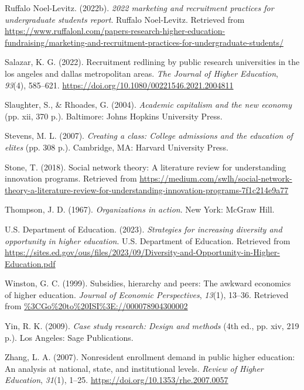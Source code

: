 \documentclass[
  12pt,
]{article}
\newlength{\cslhangindent}
\newlength{\cslentryspacingunit} %
\newenvironment{CSLReferences}[2] %
 {%
  \setlength{\parindent}{0pt}
  \ifodd #1
  \let\oldpar\par
  \def\par{\hangindent=\cslhangindent\oldpar}
  \fi
  \setlength{\parskip}{#2\cslentryspacingunit}
 }%
 {}
\begin{document}
\begin{CSLReferences}{1}{0}
\leavevmode{}%
Ruffalo Noel-Levitz. (2022b). \emph{2022 marketing and recruitment practices for undergraduate students report}. Ruffalo Noel-Levitz. Retrieved from \url{https://www.ruffalonl.com/papers-research-higher-education-fundraising/marketing-and-recruitment-practices-for-undergraduate-students/}

\leavevmode{}%
Salazar, K. G. (2022). Recruitment redlining by public research universities in the los angeles and dallas metropolitan areas. \emph{The Journal of Higher Education}, \emph{93}(4), 585--621. \url{https://doi.org/10.1080/00221546.2021.2004811}

\leavevmode{}%
Slaughter, S., \& Rhoades, G. (2004). \emph{Academic capitalism and the new economy} (pp. xii, 370 p.). Baltimore: Johns Hopkins University Press.

\leavevmode{}%
Stevens, M. L. (2007). \emph{Creating a class: College admissions and the education of elites} (pp. 308 p.). Cambridge, MA: Harvard University Press.

\leavevmode{}%
Stone, T. (2018). Social network theory: A literature review for understanding innovation programs. Retrieved from \url{https://medium.com/swlh/social-network-theory-a-literature-review-for-understanding-innovation-programs-7f1c214e9a77}

\leavevmode{}%
Thompson, J. D. (1967). \emph{Organizations in action}. New York: McGraw Hill.

\leavevmode{}%
U.S. Department of Education. (2023). \emph{Strategies for increasing diversity and opportunity in higher education}. U.S. Department of Education. Retrieved from \url{https://sites.ed.gov/ous/files/2023/09/Diversity-and-Opportunity-in-Higher-Education.pdf}

\leavevmode{}%
Winston, G. C. (1999). Subsidies, hierarchy and peers: The awkward economics of higher education. \emph{Journal of Economic Perspectives}, \emph{13}(1), 13--36. Retrieved from \url{\%3CGo\%20to\%20ISI\%3E://000078904300002}

\leavevmode{}%
Yin, R. K. (2009). \emph{Case study research: Design and methods} (4th ed., pp. xiv, 219 p.). Los Angeles: Sage Publications.

\leavevmode{}%
Zhang, L. A. (2007). Nonresident enrollment demand in public higher education: An analysis at national, state, and institutional levels. \emph{Review of Higher Education}, \emph{31}(1), 1--25. \url{https://doi.org/10.1353/rhe.2007.0057}

\end{CSLReferences}
\end{document}
